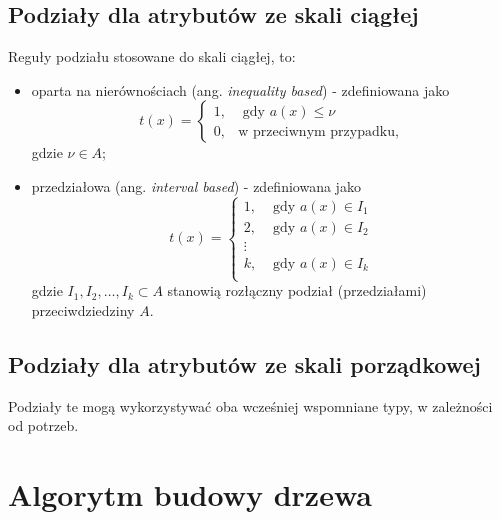 \documentclass[
]{book}
\providecommand{\tightlist}{%
  \setlength{\itemsep}{0pt}\setlength{\parskip}{0pt}}
\theoremstyle{plain}
\theoremstyle{definition}
\theoremstyle{definition}
\theoremstyle{definition}
\theoremstyle{definition}
\theoremstyle{remark}
\begin{document}
\hypertarget{podziaux142y-dla-atrybutuxf3w-ze-skali-ciux105gux142ej}{%
\subsection{Podziały dla atrybutów ze skali ciągłej}\label{podziaux142y-dla-atrybutuxf3w-ze-skali-ciux105gux142ej}}

Reguły podziału stosowane do skali ciągłej, to:

\begin{itemize}
\tightlist
\item
  oparta na nierównościach (ang. \emph{inequality based}) - zdefiniowana jako
  \begin{equation}
  t(x) = \begin{cases}
    1, &\text{ gdy }a(x)\leq \nu\\
    0, & \text{w przeciwnym przypadku},
    \end{cases}
  \end{equation}
  gdzie \(\nu\in A\);
\item
  przedziałowa (ang. \emph{interval based}) - zdefiniowana jako
  \begin{equation}
    t(x) = \begin{cases}
        1, &\text{ gdy }a(x) \in I_1\\
        2, &\text{ gdy }a(x) \in I_2\\
        \vdots & \\
        k, &\text{ gdy }a(x) \in I_k\\
    \end{cases}
  \end{equation}
  gdzie \(I_1,I_2,\ldots,I_k\subset A\) stanowią rozłączny podział (przedziałami) przeciwdziedziny \(A\).
\end{itemize}

\hypertarget{podziaux142y-dla-atrybutuxf3w-ze-skali-porzux105dkowej}{%
\subsection{Podziały dla atrybutów ze skali porządkowej}\label{podziaux142y-dla-atrybutuxf3w-ze-skali-porzux105dkowej}}

Podziały te mogą wykorzystywać oba wcześniej wspomniane typy, w zależności od potrzeb.

\hypertarget{algorytm-budowy-drzewa}{%
\section{Algorytm budowy drzewa}\label{algorytm-budowy-drzewa}}
\end{document}
